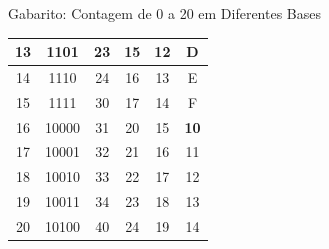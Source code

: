 \begin{frame}{Gabarito: Contagem de 0 a 20 em Diferentes Bases}
{\begin{tabular}{|c|c|c|c|c|c|}
            13               & 1101            & 23              & 15              & 12               & D                \\ \hline
            14               & 1110            & 24              & 16              & 13               & E                \\ \hline
            15               & 1111            & 30              & 17              & 14               & F                \\ \hline
            16               & 10000           & 31              & 20              & 15               & \textbf{10}      \\ \hline
            17               & 10001           & 32              & 21              & 16               & 11               \\ \hline
            18               & 10010           & 33              & 22              & 17               & 12               \\ \hline
            19               & 10011           & 34              & 23              & 18               & 13               \\ \hline
            20               & 10100           & 40              & 24              & 19               & 14               \\ \hline
        \end{tabular}
    }
\end{frame}

